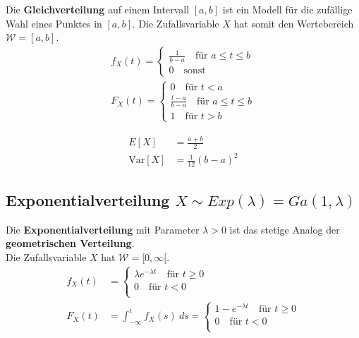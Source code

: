 \documentclass[11pt]{article}
\newcommand{\Var}{\text{Var}}
\begin{document}
Die \textbf{Gleichverteilung} auf einem Intervall $[a,b]$ ist ein Modell f{\"u}r die zuf{\"a}llige Wahl eines Punktes in $[a,b]$. Die Zufallsvariable $X$ hat somit den Wertebereich $\mathcal{W} = [a,b]$.
\begin{equation*}
\begin{split}
	f_X(t) = \begin{cases}
		\frac{1}{b-a}\quad\text{f{\"u}r }a\leq t \leq b \\
		0\quad\text{sonst }
	\end{cases} \\
	F_X(t) = \begin{cases}
		0\quad\text{f{\"u}r } t < a \\
		\frac{t-a}{b-a}\quad\text{f{\"u}r } a \leq t \leq b \\
		1\quad\text{f{\"u}r } t > b
	\end{cases}
\end{split}
\end{equation*}

\begin{equation*}
\begin{split}
	E[X] & = \frac{a+b}{2} \\
	\Var[X] & = \frac{1}{12}(b-a)^2
\end{split}
\end{equation*}

\subsection{Exponentialverteilung $X \sim Exp(\lambda) = Ga(1, \lambda)$}

Die \textbf{Exponentialverteilung} mit Parameter $\lambda > 0$ ist das stetige Analog der \textbf{geometrischen Verteilung}. \\
Die Zufallsvariable $X$ hat $\mathcal{W} = [0, \infty[$.
\begin{equation*}
\begin{split}
	f_X(t) & = \begin{cases}
		\lambda e^{-\lambda t}\quad\text{f{\"u}r } t \geq 0 \\
		0 \quad\text{f{\"u}r } t < 0 \\
	\end{cases} \\
	F_X(t) & = \int_{-\infty}^t f_X(s)\ ds = \begin{cases}
		1 - e^{-\lambda t} \quad\text{f{\"u}r } t \geq 0 \\
		0 \quad\text{f{\"u}r } t < 0 \\
	\end{cases}
\end{split}
\end{equation*}
\end{document}
